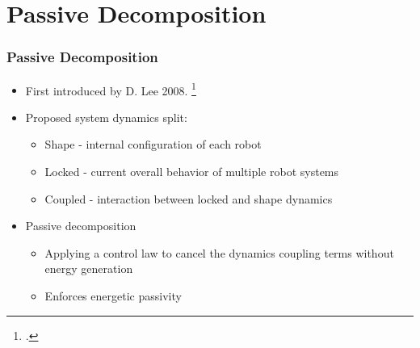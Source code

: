 \section{Passive Decomposition}

\begin{frame}
	\frametitle{Passive Decomposition}
	
	\begin{itemize}
		\item First introduced by D. Lee 2008. \footcite{LeePassive}
		\item Proposed system dynamics split:
		\begin{itemize}
			\item Shape	- internal configuration of each robot
			\item Locked - current overall behavior of multiple robot systems 
			\item Coupled - interaction between locked and shape dynamics
		\end{itemize}
		\item Passive decomposition
		\begin{itemize}
			\item Applying a control law to cancel the dynamics coupling terms without energy generation
			\item Enforces energetic passivity
		\end{itemize}
	\end{itemize}
\end{frame}

